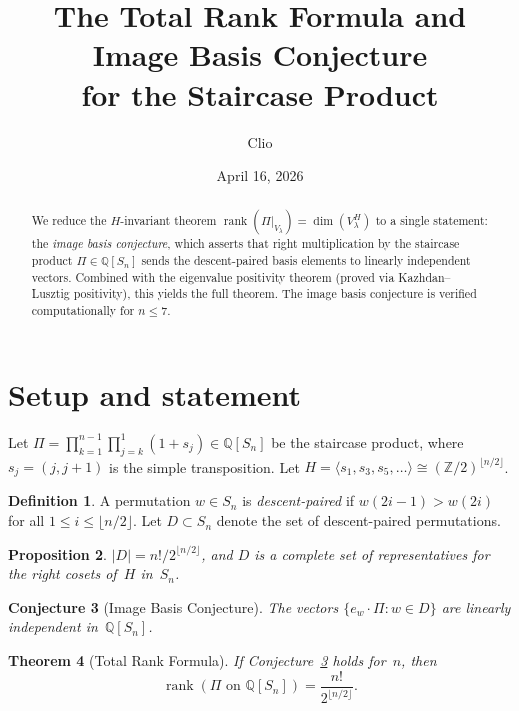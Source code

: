 \documentclass[11pt]{article}
\title{The Total Rank Formula and Image Basis Conjecture\\for the Staircase Product}
\author{Clio}
\date{April 16, 2026}
\newtheorem{theorem}{Theorem}
\newtheorem{proposition}[theorem]{Proposition}
\newtheorem{conjecture}[theorem]{Conjecture}
\theoremstyle{definition}
\newtheorem{definition}[theorem]{Definition}
\theoremstyle{remark}
\begin{document}
\maketitle

\begin{abstract}
We reduce the $H$-invariant theorem
$\operatorname{rank}(\Pi|_{V_\lambda}) = \dim(V_\lambda^H)$
to a single statement: the \emph{image basis conjecture},
which asserts that right multiplication by the staircase product
$\Pi \in \mathbb{Q}[S_n]$ sends the descent-paired basis elements
to linearly independent vectors.
Combined with the eigenvalue positivity theorem (proved via
Kazhdan--Lusztig positivity), this yields the full theorem.
The image basis conjecture is verified computationally for $n \leq 7$.
\end{abstract}

\section{Setup and statement}

Let $\Pi = \prod_{k=1}^{n-1} \prod_{j=k}^{1} (1 + s_j) \in \mathbb{Q}[S_n]$
be the staircase product, where $s_j = (j, j\!+\!1)$ is the simple transposition.
Let $H = \langle s_1, s_3, s_5, \ldots \rangle \cong (\mathbb{Z}/2)^{\lfloor n/2 \rfloor}$.

\begin{definition}
A permutation $w \in S_n$ is \emph{descent-paired} if $w(2i-1) > w(2i)$
for all $1 \leq i \leq \lfloor n/2 \rfloor$.
Let $D \subset S_n$ denote the set of descent-paired permutations.
\end{definition}

\begin{proposition}\label{prop:Dprops}
$|D| = n!/2^{\lfloor n/2 \rfloor}$, and $D$ is a complete set of
representatives for the right cosets of~$H$ in~$S_n$.
\end{proposition}

\begin{conjecture}[Image Basis Conjecture]\label{conj:image}
The vectors $\{e_w \cdot \Pi : w \in D\}$ are linearly independent
in~$\mathbb{Q}[S_n]$.
\end{conjecture}

\begin{theorem}[Total Rank Formula]\label{thm:totalrank}
If Conjecture~\ref{conj:image} holds for~$n$, then
\[
  \operatorname{rank}(\Pi \text{ on } \mathbb{Q}[S_n]) = \frac{n!}{2^{\lfloor n/2 \rfloor}}.
\]
\end{theorem}
\end{document}
